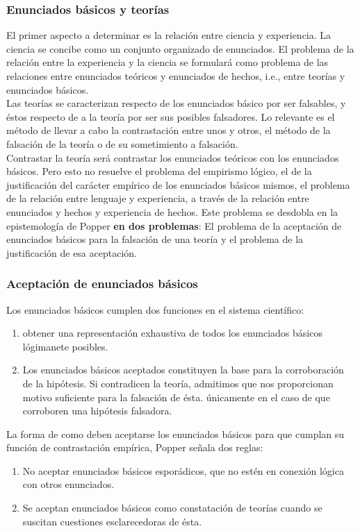\documentclass[a4paper, 11pt, twocolumn, spanish]{article}
\begin{document}
\subsubsection{Enunciados básicos y teorías}
\label{sec:orgfe74f37}
El primer aspecto a determinar es la relación entre ciencia y
experiencia. La ciencia se concibe como un conjunto organizado de
enunciados. El problema de la relación entre la experiencia y la
ciencia se formulará como problema de las relaciones entre enunciados
teóricos y enunciados de hechos, i.e., entre teorías y enunciados
básicos.\\[0pt]
Las teorías se caracterizan respecto de los enunciados básico por ser
falsables, y éstos respecto de a la teoría por ser sus posibles
falsadores. Lo relevante es el método de llevar a cabo la
contrastación entre unos y otros, el método de la falsación de la
teoría o de su sometimiento a falsación.\\[0pt]

Contrastar la teoría será contrastar los enunciados teóricos con los
enunciados básicos. Pero esto no resuelve el problema del empirismo
lógico, el de la justificación del carácter empírico de los enunciados
básicos mismos, el problema de la relación entre lenguaje y
experiencia, a través de la relación entre enunciados y hechos y
experiencia de hechos. Este problema se desdobla en la epistemología
de Popper \textbf{en dos problemas}: El problema de la aceptación de
enunciados básicos para la falsación de una teoría y el problema de la
justificación de esa aceptación.

\subsubsection{Aceptación de enunciados básicos}
\label{sec:orgf0491d3}
Los enunciados básicos cumplen dos funciones en el sistema científico:
\begin{enumerate}
\item obtener una representación exhaustiva de todos los enunciados
básicos lógimanete posibles.
\item Los enunciados básicos aceptados constituyen la base para la
corroboración de la hipótesis. Si contradicen la teoría,
admitimos que nos proporcionan motivo suficiente para la
falsación de ésta. únicamente en el caso de que corroboren una
hipótesis falsadora.
\end{enumerate}

La forma de como deben aceptarse los enunciados básicos para que
cumplan su función de contrastación empírica, Popper señala dos reglas:
\begin{enumerate}
\item No aceptar enunciados básicos esporádicos, que no estén en
conexión lógica con otros enunciados.
\item Se aceptan enunciados básicos como constatación de teorías cuando
se suscitan cuestiones esclarecedoras de ésta.
\end{enumerate}
\end{document}
